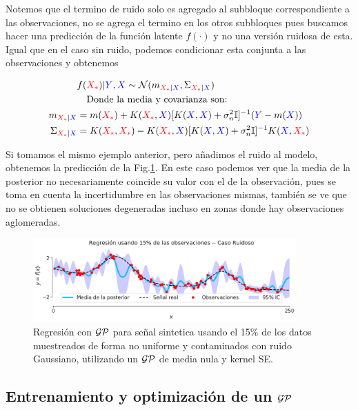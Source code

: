 Notemos que el termino de ruido solo es agregado al subbloque correspondiente a las observaciones, no se agrega el termino en los otros subbloques pues buscamos hacer una predicción de la función latente $f(\cdot)$ y no una versión ruidosa de esta.
Igual que en el caso sin ruido, podemos condicionar esta conjunta a las observaciones y obtenemos

\begin{align}
	& f(\textcolor{red}{X_*})|\textcolor{blue}{Y}, \textcolor{blue}{X}  \sim \mathcal{N}(m_{\textcolor{red}{X_*}|\textcolor{blue}{X}}, \Sigma_{\textcolor{red}{X_*}|\textcolor{blue}{X}})\\ \label{eq:gp_posterior}
	& \quad \text{Donde la media y covarianza son:} \nonumber \\
	m_{\textcolor{red}{X_*}|\textcolor{blue}{X}} & = m(\textcolor{red}{X_*}) + K(\textcolor{red}{X_*}, \textcolor{blue}{X}) [K(\textcolor{blue}{X}, \textcolor{blue}{X}) + \sigma_n^2 {\mathbb I}]^{-1} (\textcolor{blue}{Y} - m(\textcolor{blue}{X}))\\
	 \Sigma_{\textcolor{red}{X_*}|\textcolor{blue}{X}} & = K(\textcolor{red}{X_*}, \textcolor{red}{X_*}) - K(\textcolor{red}{X_*}, \textcolor{blue}{X}) [K(\textcolor{blue}{X}, \textcolor{blue}{X}) + \sigma_n^2 {\mathbb I}]^{-1} K(\textcolor{blue}{X}, \textcolor{red}{X_*})
\end{align}


Si tomamos el mismo ejemplo anterior, pero añadimos el ruido al modelo, obtenemos la predicción de la Fig.\ref{fig:gp_3}. En este caso podemos ver que la media de la posterior no necesariamente coincide su valor con el de la observación, pues se toma en cuenta la incertidumbre en las observaciones mismas, también se ve que no se obtienen soluciones degeneradas incluso en zonas donde hay observaciones aglomeradas.


\begin{figure}[H]
	\centering
	\includegraphics[width=0.9\textwidth]{img/cap6_gp_posterior_ruido}
	\caption{Regresión con $\mathcal{GP}$ para señal sintetica usando el 15$\%$ de los datos muestreados de forma no uniforme y contaminados con ruido Gaussiano, utilizando un $\mathcal{GP}$ de media nula y kernel SE.}
	\label{fig:gp_3}
\end{figure}



\subsection{Entrenamiento y optimización de un $\mathcal{GP}$}

